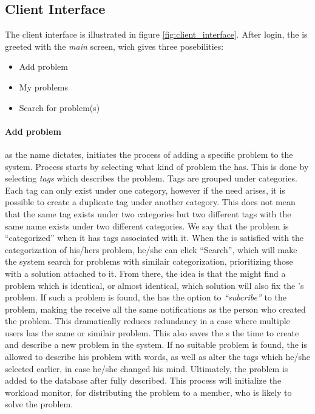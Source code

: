 \subsection{Client Interface}
\label{sec:client_interface}

The client interface is illustrated in figure \ref{fig:client_interface}.
After login, the \aclient[] is greeted with the \textit{main} screen, wich gives three posebilities:
\begin{itemize}
	\item Add problem
	\item My problems
	\item Search for problem(s)
\end{itemize}

\paragraph{Add problem}as the name dictates, initiates the process of adding a specific problem to the system. Process starts by selecting what kind of problem the \aclient[] has. This is done by selecting \textit{tags} which describes the problem. Tags are grouped under categories. Each tag can only exist under one category, however if the need arises, it is possible to create a duplicate tag under another category. This does not mean that the same tag exists under two categories but two different tags with the same name exists under two different categories. We say that the problem is ``categorized'' when it has tags associated with it.
When the \aclient[] is satisfied with the categorization of his/hers problem, he/she can click ``Search'', which will make the system search for problems with similair categorization, prioritizing those with a solution attached to it.
From there, the idea is that the \aclient[] might find a problem which is identical, or almost identical, which solution will also fix the \aclient 's problem. If such a problem is found, the \aclient[] has the option to \textit{``subcribe''} to the problem, making the \aclient[] receive all the same notifications as the person who created the problem. This dramatically reduces redundancy in a case where multiple users has the same or similair problem. This also saves the \aclient s the time to create and describe a new problem in the system.
If no suitable problem is found, the \aclient[] is allowed to describe his problem with words, as well as alter the tags which he/she selected earlier, in case he/she changed his mind. Ultimately, the problem is added to the database after fully described. This process will initialize the workload monitor, for distributing the problem to a \astaff[] member, who is likely to solve the problem.
